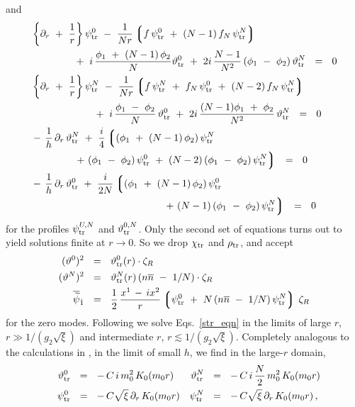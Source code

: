 \documentclass[12pt]{article}
\newcommand{\p}{\partial}
\newcommand{\wt}{\widetilde}
\newcommand{\ov}{\overline}
\newcommand{\lgr}{\left\lgroup}
\newcommand{\rgr}{\right\rgroup}
\newcommand{\zr}{\zeta_R}
\newcommand{\nbar}{\ov{n}}
\newcommand{\pts}{\psi_{\rm tr}^0}
\newcommand{\ptN}{\psi_{\rm tr}^N}
\newcommand{\tts}{\vartheta_{\rm tr}^0}
\newcommand{\ttN}{\vartheta_{\rm tr}^N}
\begin{document}
	and 
\begin{align}
\label{str_eqn}
%
\notag
	&
	\left\{ \p_r ~+~ \frac{1}{r} \right\} \pts ~-~ \frac{1}{Nr}\lgr f\,\pts ~+~ (N-1)\, f_N\, \ptN \rgr \\
\notag
	&
	\qquad\qquad
		~+~ i\, \frac{ \phi_1 ~+~ (N-1)\,\phi_2}{N} \tts 
		~+~ 2i\, \frac{N-1}{N^2}\, (\phi_1 ~-~ \phi_2)\, \ttN ~~=~~ 0
\\
%
\notag
	&
	\left\{ \p_r ~+~ \frac{1}{r} \right\} \ptN ~-~ \frac{1}{Nr} \lgr f\, \ptN ~+~ f_N\, \pts ~+~ (N-2)\,f_N\,\ptN \rgr \\
	& 
	\qquad\qquad\qquad
		~+~ i\, \frac{\phi_1 ~-~ \phi_2}{N}\, \tts 
		~+~ 2i\, \frac{(N-1)\phi_1 ~+~ \phi_2}{N^2}\, \ttN ~~=~~ 0
\\
%
\notag
	&
	-\,\frac{1}{h}\, \p_r\, \ttN 
		~+~ \frac{i}{4} \lgr (\phi_1 ~+~ (N-1)\,\phi_2)\,\ptN \right. \\
\notag
	&
	\qquad\qquad
		\left.
		~+~ (\phi_1~-~\phi_2)\,\pts ~+~ (N-2)\,(\phi_1~-~\phi_2)\,\ptN \rgr ~~=~~ 0
\\
%
\notag
	&
	-\,\frac{1}{h}\, \p_r\, \tts 
		~+~ \frac{i}{2N} \lgr (\phi_1 ~+~ (N-1)\,\phi_2)\,\pts \right. \\
\notag
	&
	\qquad\qquad\qquad\qquad\qquad\qquad\quad
		\left.
		~+~ (N-1)\,(\phi_1~-~\phi_2)\,\ptN \rgr ~~=~~0
\end{align}
	for the profiles $ \psi_{\rm tr}^{U,N} $ and $ \vartheta_{\rm tr}^{0,N} $.
	Only the second set of equations turns out to yield solutions finite at $ r \to 0 $.
	So we drop $ \chi_{\rm tr} $ and $ \rho_{\rm tr} $, and accept
\begin{align}
%
\notag
	(\vartheta^0)^2 & ~~=~~ \tts(r) \cdot \zr 
\\
%
\label{tr_anz}
	(\vartheta^N)^2 & ~~=~~ \ttN(r)\, (n\nbar ~-~ 1/N) \cdot \zr
\\
%
\notag
	\ov{\wt{\psi}}{}_{\dot 1} & ~~=~~ \frac{1}{2}\, \frac{x^1 \,-\, ix^2}{r} 
						\lgr \pts ~+~ N\,(n\nbar ~-~ 1/N)\, \ptN \rgr \, \zr
\end{align}
	for the zero modes.
	Following \cite{GSYmmodel,BSYhet} we solve Eqs.~\eqref{str_eqn} in the limits of large $r$,
	$ r \gg 1/(g_2\sqrt{\xi}) $ and intermediate $r$, $ r \lesssim 1/(g_2\sqrt{\xi}) $.
	Completely analogous to the calculations in \cite{GSYmmodel,BSYhet}, in the limit of 
	small $h$, we find in the large-$r$ domain,
\begin{align*}
%
	&& \tts &~~=~~ -\, C\,i\,m_0^2\, K_0(m_0 r) 
	& \ttN & ~~=~~ -\, C\,i\,\frac{N}{2}\,m_0^2\,K_0(m_0 r) \\
%
	&& \pts &~~=~~ -\, C\sqrt{\xi}\,\p_r\,K_0(m_0 r) 
	& \ptN & ~~=~~ -\, C\sqrt{\xi}\,\p_r\,K_0(m_0 r)\,,
\end{align*}
\end{document}

